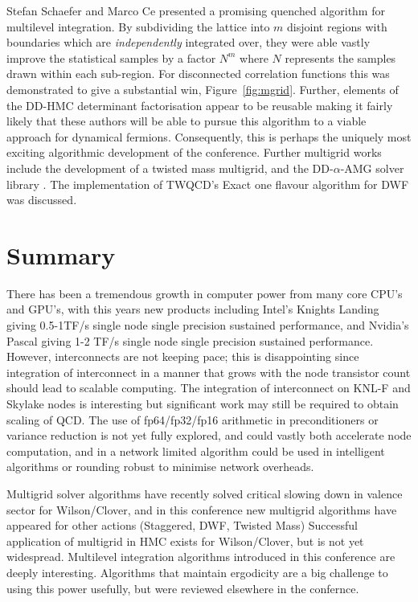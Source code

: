 \documentclass{PoS}
\begin{document}
Stefan Schaefer and Marco Ce presented a promising quenched algorithm for multilevel integration\cite{schaefer}.
By subdividing the lattice into $m$ disjoint regions with boundaries which are \emph{independently} integrated
over, they were able vastly improve the statistical samples by a factor $N^m$ where $N$ represents the samples
drawn within each sub-region. For disconnected correlation functions this was demonstrated to give a substantial
win, Figure~\ref{fig:mgrid}. Further, elements of the DD-HMC determinant factorisation appear to be reusable
making it fairly likely that these authors will be able to pursue this algorithm to a viable approach for
dynamical fermions. Consequently, this is perhaps the uniquely most exciting algorithmic development of the conference.
Further multigrid works include the development of a twisted mass multigrid, and the
DD-$\alpha$-AMG solver library \cite{Bacchio}. The implementation of TWQCD's Exact one flavour algorithm for DWF
was discussed\cite{murphy}.

\section{Summary}
There has been a tremendous growth in computer power from many core CPU's and GPU's, with this
years new products including Intel's Knights Landing giving 0.5-1TF/s single node single precision
sustained performance, and Nvidia's Pascal giving 1-2 TF/s single node single precision sustained performance.
However, interconnects are not keeping pace; this is disappointing since integration of interconnect
in a manner that grows with the node transistor count should lead to scalable computing. The integration
of interconnect on KNL-F and Skylake nodes is interesting but significant work may still be required to obtain
scaling of QCD.
The use of fp64/fp32/fp16 arithmetic in preconditioners or variance reduction is not yet fully explored, and could
vastly both accelerate node computation, and in a network limited algorithm could be used in intelligent algorithms
or rounding robust to minimise network overheads.

Multigrid solver algorithms have recently solved critical slowing down in valence sector for Wilson/Clover,
and in this conference new multigrid algorithms have appeared for other actions (Staggered, DWF, Twisted Mass)
Successful application of multigrid in HMC exists for Wilson/Clover, but is not yet widespread.
Multilevel integration algorithms introduced in this conference are deeply interesting.
Algorithms that maintain ergodicity are a big challenge to using this power usefully, but were reviewed elsewhere in
the confernce.
\end{document}

